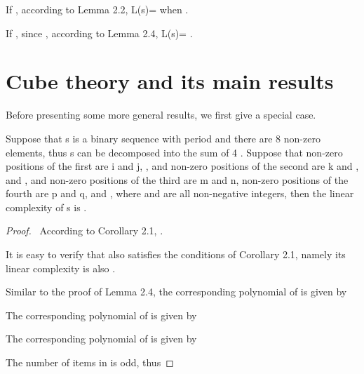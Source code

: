 \documentclass[10pt,conference,twocolumn]{IEEEtran}
\begin{document}
If , according to Lemma 2.2, L(s)= 
when .

 If , since , according to Lemma 2.4, L(s)= .


\section{Cube theory and its main results}

Before presenting some more general results, we first give a special
case.

 Suppose that s is a binary sequence with
period  and there are 8 non-zero elements, thus s can be
decomposed into the sum of 4 . Suppose that non-zero
positions of the first  are i and j, , and
non-zero positions of the second  are k and ,
and , and non-zero positions of the third
 are m and n, non-zero positions of the fourth  are
p and q, and , where
 and  are all non-negative integers, then the
linear complexity of s is .

\begin{proof}\
According to Corollary 2.1, .

It is easy to verify that  also satisfies the
conditions of Corollary 2.1, namely its linear complexity is also
.

Similar to the proof of Lemma 2.4, the corresponding polynomial of
 is given by


The corresponding polynomial of  is given by


The corresponding polynomial of  is
given by


 The number of items in   is odd, thus
 
\end{proof}\



\unitlength=0.26mm
\end{document}
